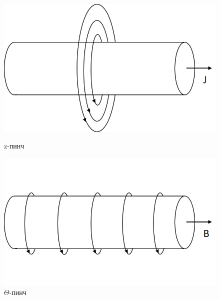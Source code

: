 \documentclass[12pt]{kiarticle} %
\begin{document}
	\begin{figure}[h]
		\begin{center}
			\begin{minipage}[h]{0.4\linewidth}
				\includegraphics[width=1\linewidth]{Pic1.jpg}
				\caption{z-пинч} %
				\label{pic1a} %
			\end{minipage}
			\hfill
			\begin{minipage}[h]{0.4\linewidth}
				\includegraphics[width=1\linewidth]{Pic2.jpg}
				\caption{$\Theta$-пинч}
				\label{pic1b}
			\end{minipage}
		\end{center}
	\end{figure}
\end{document}
